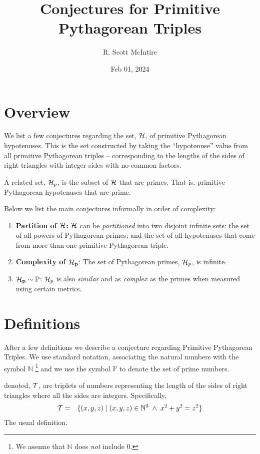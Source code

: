 \documentclass{article}
\title{Conjectures for Primitive Pythagorean Triples}
\author{R. Scott McIntire}
\date{Feb 01, 2024}
\theoremstyle{definition}
\begin{document}
\maketitle


\section{Overview}
We list a few conjectures regarding the set, ${\cal H}$, of primitive 
Pythagorean hypotenuses. This is the set constructed by taking the 
``hypotenuse'' value from all primitive Pythagorean triples -- corresponding 
to the lengths of the sides of right triangles with integer sides with 
no common factors.

A related set, ${\cal H}_p$, is the subset of ${\cal H}$ that are primes. 
That is, primitive Pythagorean hypotenuses that are prime.

Below we list the main conjectures informally in order of 
complexity:
\begin{enumerate}
    \item{{\bf Partition of ${\cal H}$:\/}}{ ${\cal H}$ can be {\em partitioned\/} 
      into two disjoint infinite sets: 
    the set of all powers of Pythagorean primes; and the set of all 
        hypotenuses that come from more than one primitive Pythagorean triple.}
    \item{{\bf Complexity of ${\bf {\cal H}_p}$}: \/}{The set of Pythagorean primes, 
      ${\cal H}_p$, is infinite.}
  \item{${\bf {\cal H}_p} \sim \mathbb{P}$: \/}{${\cal H}_p$ is also {\em similar\/} and as {\em complex\/} as 
        the primes when measured using certain metrics.}
\end{enumerate}


\section{Definitions}
After a few definitions we describe a conjecture regarding Primitive 
Pythagorean Triples. We use standard notation, associating the natural 
numbers with the symbol $\mathbb{N}$%
\footnote{We assume that $\mathbb{N}$ does {\em not\/} include $0$.}
and we use the symbol $\mathbb{P}$ to denote the set of prime numbers.


 denoted, ${\cal T}$, are  triplets of 
numbers representing the length of the sides of
right triangles where all the sides are integers. Specifically,
\begin{eqnarray}
  {\cal T} & = & \{ (x,y,z) \; | \; (x,y,z) \in \mathbb{N}^3 \; \wedge \; x^2 + y^2 = z^2 \}
\end{eqnarray}
The usual definition.
\end{document}
